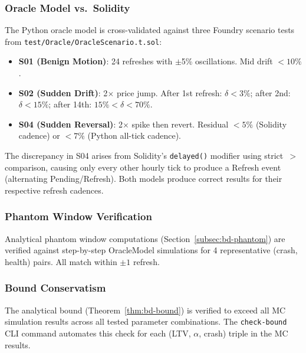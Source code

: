 \documentclass[10pt,a4paper,twocolumn]{article}
\theoremstyle{definition}
\theoremstyle{plain}
\theoremstyle{remark}
\begin{document}
\subsubsection{Oracle Model vs.\ Solidity}
\label{subsec:bd-oracle-validation}

The Python oracle model is cross-validated against three Foundry scenario tests from \texttt{test/Oracle/OracleScenario.t.sol}:

\begin{itemize}[leftmargin=*]
\item \textbf{S01 (Benign Motion)}: 24 refreshes with $\pm$5\% oscillations. Mid drift $< 10\%$. \checkmark
\item \textbf{S02 (Sudden Drift)}: 2$\times$ price jump. After 1st refresh: $\delta < 3\%$; after 2nd: $\delta < 15\%$; after 14th: $15\% < \delta < 70\%$. \checkmark
\item \textbf{S04 (Sudden Reversal)}: 2$\times$ spike then revert. Residual $< 5\%$ (Solidity cadence) or $< 7\%$ (Python all-tick cadence). \checkmark
\end{itemize}

\noindent The discrepancy in S04 arises from Solidity's \texttt{delayed()} modifier using strict~$>$ comparison, causing only every other hourly tick to produce a Refresh event (alternating Pending/Refresh). Both models produce correct results for their respective refresh cadences.

\subsubsection{Phantom Window Verification}
\label{subsec:bd-phantom-validation}

Analytical phantom window computations (Section~\ref{subsec:bd-phantom}) are verified against step-by-step OracleModel simulations for 4 representative (crash, health) pairs. All match within $\pm 1$ refresh.

\subsubsection{Bound Conservatism}
\label{subsec:bd-bound-validation}

The analytical bound (Theorem~\ref{thm:bd-bound}) is verified to exceed all MC simulation results across all tested parameter combinations. The \texttt{check-bound} CLI command automates this check for each (LTV, $\alpha$, crash) triple in the MC results.

\end{document}
